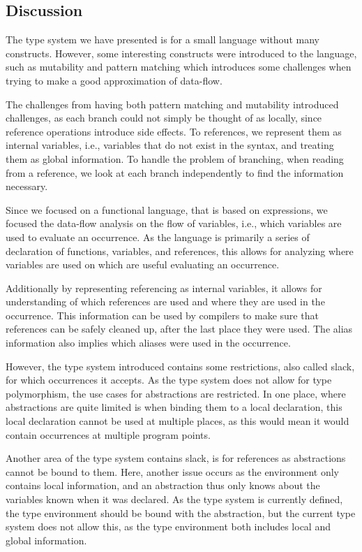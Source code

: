 \documentclass[acmsmall,sigplan]{acmart}
\begin{document}
\subsection{Discussion}

The type system we have presented is for a small language without many
constructs. 
However, some interesting constructs were introduced to the language,
such as mutability and pattern matching which introduces some
challenges when trying to make a good approximation of data-flow. 

The challenges from having both pattern matching and mutability introduced challenges, as each branch could not simply be thought of as locally, since reference operations introduce side effects.
To references, we represent them as internal variables, i.e., variables that do not exist in the syntax, and treating them as global information.
To handle the problem of branching, when reading from a reference, we look at each branch independently to find the information necessary.
\bigskip

Since we focused on a functional language, that is based on
expressions, we focused the data-flow analysis on the flow of
variables, i.e., which variables are used to evaluate an occurrence.
As the language is primarily a series of declaration of functions,
variables, and references, this allows for analyzing where variables
are used on which are useful evaluating an occurrence.

Additionally by representing referencing as internal variables, it
allows for understanding of which references are used and where they
are used in the occurrence.  This information can be used by compilers
to make sure that references can be safely cleaned up, after the last
place they were used.  The alias information also implies which
aliases were used in the occurrence.

However, the type system introduced contains some restrictions, also
called slack, for which occurrences it accepts.  As the type system
does not allow for type polymorphism, the use cases for abstractions
are restricted.  In one place, where abstractions are quite limited is
when binding them to a local declaration, this local declaration
cannot be used at multiple places, as this would mean it would contain
occurrences at multiple program points.

Another area of the type system contains slack, is for references as abstractions cannot be bound to them.
Here, another issue occurs as the environment only contains local information, and an abstraction thus only knows about the variables known when it was declared.
As the type system is currently defined, the type environment should be bound with the abstraction, but the current type system does not allow this, as the type environment both includes local and global information.
\end{document}
